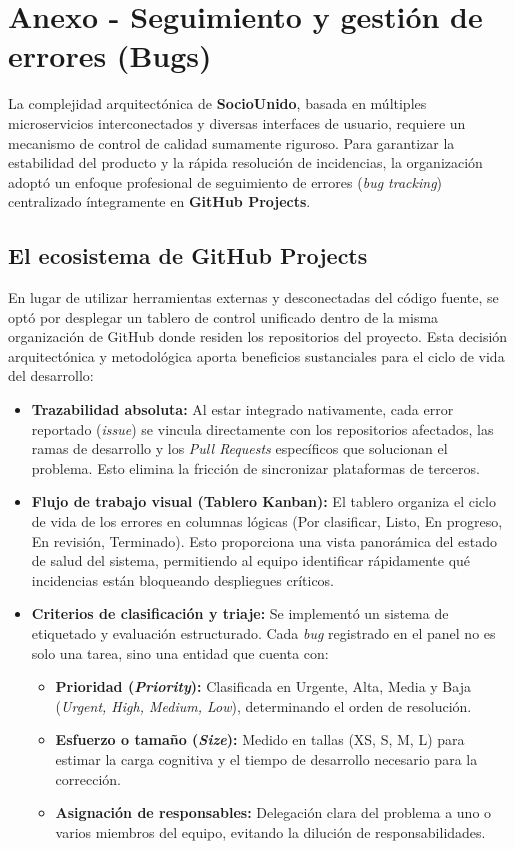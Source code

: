 \section{Anexo - Seguimiento y gestión de errores (Bugs)}

La complejidad arquitectónica de \textbf{SocioUnido}, basada en múltiples microservicios interconectados y diversas interfaces de usuario, requiere un mecanismo de control de calidad sumamente riguroso. Para garantizar la estabilidad del producto y la rápida resolución de incidencias, la organización adoptó un enfoque profesional de seguimiento de errores (\textit{bug tracking}) centralizado íntegramente en \textbf{GitHub Projects}.

\subsection{El ecosistema de GitHub Projects}

En lugar de utilizar herramientas externas y desconectadas del código fuente, se optó por desplegar un tablero de control unificado dentro de la misma organización de GitHub donde residen los repositorios del proyecto. Esta decisión arquitectónica y metodológica aporta beneficios sustanciales para el ciclo de vida del desarrollo:

\begin{itemize}
    \item \textbf{Trazabilidad absoluta:} Al estar integrado nativamente, cada error reportado (\textit{issue}) se vincula directamente con los repositorios afectados, las ramas de desarrollo y los \textit{Pull Requests} específicos que solucionan el problema. Esto elimina la fricción de sincronizar plataformas de terceros.
    \item \textbf{Flujo de trabajo visual (Tablero Kanban):} El tablero organiza el ciclo de vida de los errores en columnas lógicas (Por clasificar, Listo, En progreso, En revisión, Terminado). Esto proporciona una vista panorámica del estado de salud del sistema, permitiendo al equipo identificar rápidamente qué incidencias están bloqueando despliegues críticos.
    \item \textbf{Criterios de clasificación y triaje:} Se implementó un sistema de etiquetado y evaluación estructurado. Cada \textit{bug} registrado en el panel no es solo una tarea, sino una entidad que cuenta con:
    \begin{itemize}
        \item \textbf{Prioridad (\textit{Priority}):} Clasificada en Urgente, Alta, Media y Baja (\textit{Urgent, High, Medium, Low}), determinando el orden de resolución.
        \item \textbf{Esfuerzo o tamaño (\textit{Size}):} Medido en tallas (XS, S, M, L) para estimar la carga cognitiva y el tiempo de desarrollo necesario para la corrección.
        \item \textbf{Asignación de responsables:} Delegación clara del problema a uno o varios miembros del equipo, evitando la dilución de responsabilidades.
    \end{itemize}
\end{itemize}


